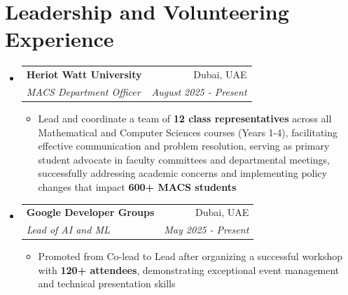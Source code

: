 \documentclass[a4paper,20pt]{article}
\makeatletter
\newcommand{\resumeItemWithoutTitle}[1] {
	\item\small{
		{#1 \vspace{-2pt}}
	}
}
\newcommand{\resumeSubheading}[4] {
	\vspace{-1pt}\item
	\begin{tabular*}{0.97\textwidth}{l@{\extracolsep{\fill}}r}
		\textbf{#1} & #2 \\
		\textit{#3} & \textit{#4} \\
	\end{tabular*}\vspace{-5pt}
}
\newcommand{\resumeSubHeadingListStart}{\begin{itemize}[leftmargin=*]}
\newcommand{\resumeSubHeadingListEnd}{\end{itemize}}
\newcommand{\resumeItemListStart}{\begin{itemize}}
\newcommand{\resumeItemListEnd}{\end{itemize}\vspace{-5pt}}
\makeatother
\begin{document}
\begin{description}[font=$\bullet$]

\end{description}
\vspace{2pt}

\section{Leadership and Volunteering Experience}
        \resumeSubHeadingListStart
        \resumeSubheading{{Heriot Watt University}}{Dubai, UAE}{MACS Department Officer}{August 2025 - Present}
        \resumeItemListStart
		  \resumeItemWithoutTitle{Lead and coordinate a team of \textbf{12 class representatives} across all Mathematical and Computer Sciences courses (Years 1-4), facilitating effective communication and problem resolution, serving as primary student advocate in faculty committees and departmental meetings, successfully addressing academic concerns and implementing policy changes that impact \textbf{600+ MACS students}}
		\resumeItemListEnd
	\resumeSubHeadingListEnd
    
	\resumeSubHeadingListStart
        \resumeSubheading{{Google Developer Groups}}{Dubai, UAE}{Lead of AI and ML}{May 2025 - Present}
        \resumeItemListStart
			\resumeItemWithoutTitle{Promoted from Co-lead to Lead after organizing a successful workshop with \textbf{120+ attendees}, demonstrating exceptional event management and technical presentation skills}
		\resumeItemListEnd
	\resumeSubHeadingListEnd
\end{document}
